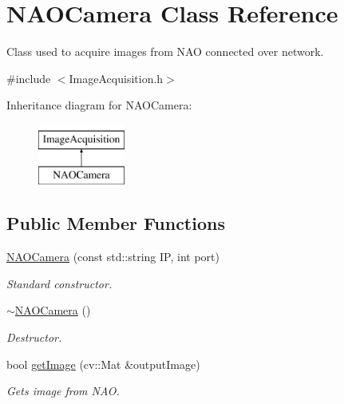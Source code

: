\hypertarget{classNAOCamera}{\section{\-N\-A\-O\-Camera \-Class \-Reference}
\label{classNAOCamera}
}


\-Class used to acquire images from \-N\-A\-O connected over network.  




{\ttfamily \#include $<$\-Image\-Acquisition.\-h$>$}

\-Inheritance diagram for \-N\-A\-O\-Camera\-:\begin{figure}[H]
\begin{center}
\leavevmode
\includegraphics[height=2.000000cm]{classNAOCamera}
\end{center}
\end{figure}
\subsection*{\-Public \-Member \-Functions}
\begin{DoxyCompactItemize}
\item 
\hyperlink{classNAOCamera_a584e00b66c60403015a40751080dd934}{\-N\-A\-O\-Camera} (const std\-::string \-I\-P, int port)
\begin{DoxyCompactList}\small\item\em \-Standard constructor. \end{DoxyCompactList}\item 
\hyperlink{classNAOCamera_a47f8a368e74438cb8ded8398fe21ffa8}{$\sim$\-N\-A\-O\-Camera} ()
\begin{DoxyCompactList}\small\item\em \-Destructor. \end{DoxyCompactList}\item 
bool \hyperlink{classNAOCamera_a7315ec601d76c75cc79eaa18cecb5be7}{get\-Image} (cv\-::\-Mat \&output\-Image)
\begin{DoxyCompactList}\small\item\em \-Gets image from \-N\-A\-O. \end{DoxyCompactList}\end{DoxyCompactItemize}



